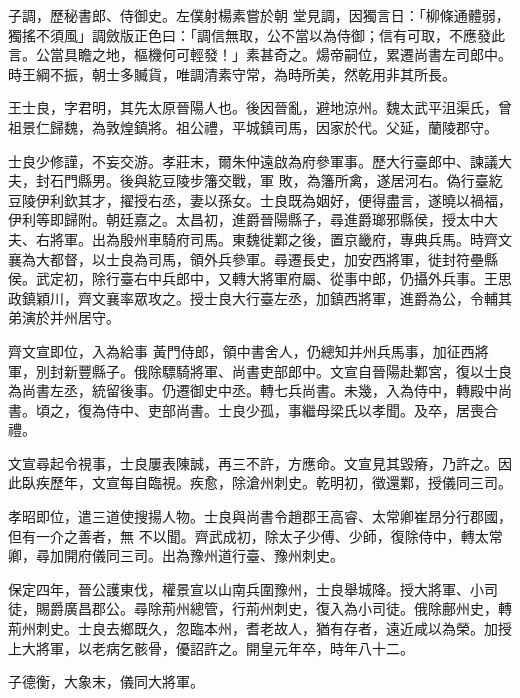 \begin{pinyinscope}
 子調，歷秘書郎、侍御史。左僕射楊素嘗於朝
 堂見調，因獨言日：「柳條通體弱，獨搖不須風」調斂版正色曰：「調信無取，公不當以為侍御；信有可取，不應發此言。公當具瞻之地，樞機何可輕發！」素甚奇之。煬帝嗣位，累遷尚書左司郎中。時王綱不振，朝士多贓貨，唯調清素守常，為時所美，然乾用非其所長。



 王士良，字君明，其先太原晉陽人也。後因晉亂，避地涼州。魏太武平沮渠氏，曾祖景仁歸魏，為敦煌鎮將。祖公禮，平城鎮司馬，因家於代。父延，蘭陵郡守。



 士良少修謹，不妄交游。孝莊末，爾朱仲遠啟為府參軍事。歷大行臺郎中、諫議大夫，封石門縣男。後與紇豆陵步籓交戰，軍
 敗，為籓所禽，遂居河右。偽行臺紇豆陵伊利欽其才，擢授右丞，妻以孫女。士良既為姻好，便得盡言，遂曉以禍福，伊利等即歸附。朝廷嘉之。太昌初，進爵晉陽縣子，尋進爵瑯邪縣侯，授太中大夫、右將軍。出為殷州車騎府司馬。東魏徙鄴之後，置京畿府，專典兵馬。時齊文襄為大都督，以士良為司馬，領外兵參軍。尋遷長史，加安西將軍，徙封符壘縣侯。武定初，除行臺右中兵郎中，又轉大將軍府屬、從事中郎，仍攝外兵事。王思政鎮穎川，齊文襄率眾攻之。授士良大行臺左丞，加鎮西將軍，進爵為公，令輔其弟演於并州居守。



 齊文宣即位，入為給事
 黃門侍郎，領中書舍人，仍總知并州兵馬事，加征西將軍，別封新豐縣子。俄除驃騎將軍、尚書吏部郎中。文宣自晉陽赴鄴宮，復以士良為尚書左丞，統留後事。仍遷御史中丞。轉七兵尚書。未幾，入為侍中，轉殿中尚書。頃之，復為侍中、吏部尚書。士良少孤，事繼母梁氏以孝聞。及卒，居喪合禮。



 文宣尋起令視事，士良屢表陳誠，再三不許，方應命。文宣見其毀瘠，乃許之。因此臥疾歷年，文宣每自臨視。疾愈，除滄州刺史。乾明初，徵還鄴，授儀同三司。



 孝昭即位，遣三道使搜揚人物。士良與尚書令趙郡王高睿、太常卿崔昂分行郡國，但有一介之善者，無
 不以聞。齊武成初，除太子少傅、少師，復除侍中，轉太常卿，尋加開府儀同三司。出為豫州道行臺、豫州刺史。



 保定四年，晉公護東伐，權景宣以山南兵圍豫州，士良舉城降。授大將軍、小司徒，賜爵廣昌郡公。尋除荊州總管，行荊州刺史，復入為小司徒。俄除鄜州史，轉荊州刺史。士良去鄉既久，忽臨本州，耆老故人，猶有存者，遠近咸以為榮。加授上大將軍，以老病乞骸骨，優詔許之。開皇元年卒，時年八十二。



 子德衡，大象末，儀同大將軍。




\end{pinyinscope}
